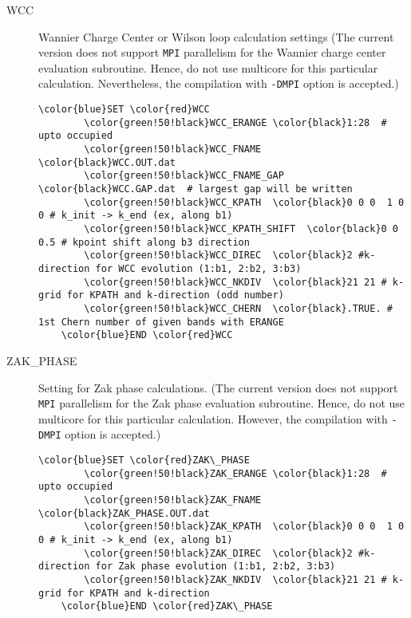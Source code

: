 \documentclass[a4paper,12pt]{scrartcl}
\makeatletter
\def\namedlabel#1#2{\begingroup
    #2%
    \def\@currentlabel{#2}%
    \phantomsection\label{#1}\endgroup
}
\makeatother
\begin{document}
\begin{description}
    \item[\namedlabel{tag:WCC}{WCC}]Wannier Charge Center or Wilson loop calculation settings
        (The current version does not support
        \texttt{MPI} parallelism for the Wannier charge center evaluation subroutine. 
        Hence, do not use multicore for this particular calculation. 
        Nevertheless, the compilation with \texttt{-DMPI} option is accepted.)
 \begin{Verbatim}[commandchars=\\\{\},gobble=4, frame=single, framesep=2mm, 
    label= Wannier charge center (WCC) setup: kz 0.5 (shift),
    labelposition=bottomline]
    \color{blue}SET \color{red}WCC
        \color{green!50!black}WCC_ERANGE \color{black}1:28  # upto occupied
        \color{green!50!black}WCC_FNAME  \color{black}WCC.OUT.dat 
        \color{green!50!black}WCC_FNAME_GAP \color{black}WCC.GAP.dat  # largest gap will be written
        \color{green!50!black}WCC_KPATH  \color{black}0 0 0  1 0 0 # k_init -> k_end (ex, along b1)
        \color{green!50!black}WCC_KPATH_SHIFT  \color{black}0 0 0.5 # kpoint shift along b3 direction
        \color{green!50!black}WCC_DIREC  \color{black}2 #k-direction for WCC evolution (1:b1, 2:b2, 3:b3)
        \color{green!50!black}WCC_NKDIV  \color{black}21 21 # k-grid for KPATH and k-direction (odd number)
        \color{green!50!black}WCC_CHERN  \color{black}.TRUE. # 1st Chern number of given bands with ERANGE
    \color{blue}END \color{red}WCC
 \end{Verbatim}


 	\item[\namedlabel{tag:ZAKPHASE}{ZAK\_PHASE}]
		Setting for Zak phase calculations. (The current version does not support
        \texttt{MPI} parallelism for the Zak phase evaluation subroutine. Hence, do not use
        multicore for this particular calculation. However, the compilation with 
        \texttt{-DMPI} option is accepted.)

 \begin{Verbatim}[commandchars=\\\{\},gobble=4, frame=single, framesep=2mm, 
    label= Zak phase setup,
    labelposition=bottomline]
    \color{blue}SET \color{red}ZAK\_PHASE
        \color{green!50!black}ZAK_ERANGE \color{black}1:28  # upto occupied
        \color{green!50!black}ZAK_FNAME  \color{black}ZAK_PHASE.OUT.dat 
        \color{green!50!black}ZAK_KPATH  \color{black}0 0 0  1 0 0 # k_init -> k_end (ex, along b1)
        \color{green!50!black}ZAK_DIREC  \color{black}2 #k-direction for Zak phase evolution (1:b1, 2:b2, 3:b3)
        \color{green!50!black}ZAK_NKDIV  \color{black}21 21 # k-grid for KPATH and k-direction
    \color{blue}END \color{red}ZAK\_PHASE
 \end{Verbatim}


\end{description}
\end{document}
